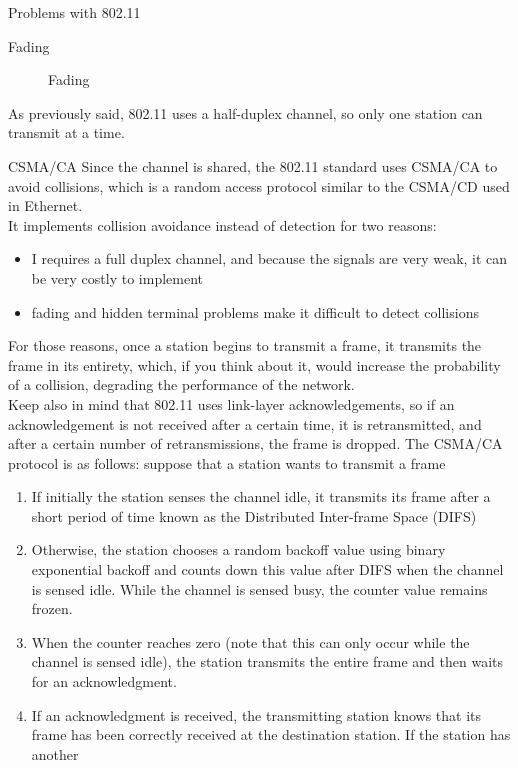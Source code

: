 \begin{section}{Problems with 802.11}
\begin{subsection}{Fading}
\begin{figure}[h]
      \caption{Fading}
      \label{fig:fading}
    \end{figure}
  \end{subsection}
  As previously said, 802.11 uses a half-duplex channel, so only one station can transmit at a time.
  \begin{subsection}{CSMA/CA}
    Since the channel is shared, the 802.11 standard uses CSMA/CA to avoid collisions, which is a 
    random access protocol similar to the CSMA/CD used in Ethernet.\\
    It implements collision avoidance instead of detection for two reasons:
    \begin{itemize}
      \item I requires a full duplex channel, and because the signals are very weak, it can be very
        costly to implement
      \item fading and hidden terminal problems make it difficult to detect collisions
    \end{itemize}
    For those reasons, once a station begins to transmit a frame, it transmits the frame in its 
    entirety, which, if you think about it, would increase the probability of a collision, degrading
    the performance of the network.\\
    Keep also in mind that 802.11 uses link-layer acknowledgements, so if an acknowledgement is not
    received after a certain time, it is retransmitted, and after a certain number of retransmissions,
    the frame is dropped.
    The CSMA/CA protocol is as follows: suppose that a station wants to transmit a frame
    \begin{enumerate}
      \item If initially the station senses the channel idle, it transmits its frame after a short 
        period of time known as the Distributed Inter-frame Space (DIFS)
      \item Otherwise, the station chooses a random backoff value using binary exponential backoff 
         and counts down this value after DIFS when the channel is sensed idle. While the channel 
         is sensed busy, the counter value remains frozen.
      \item When the counter reaches zero (note that this can only occur while the channel is 
        sensed idle), the station transmits the entire frame and then waits for an acknowledgment.
      \item If an acknowledgment is received, the transmitting station knows that its frame has 
        been correctly received at the destination station. If the station has another 

\end{enumerate}
\end{subsection}
\end{section}
